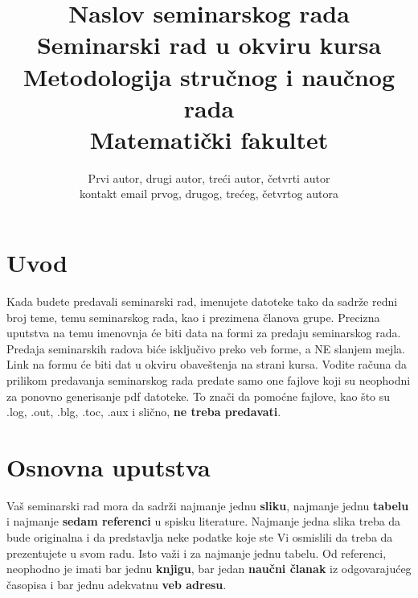 \documentclass[a4paper]{article}
\begin{document}
\title{Naslov seminarskog rada\\ \small{Seminarski rad u okviru kursa\\Metodologija stručnog i naučnog rada\\ Matematički fakultet}}

\author{Prvi autor, drugi autor, treći autor, četvrti autor\\ kontakt email prvog, drugog, trećeg, četvrtog autora}


\maketitle


\tableofcontents

\newpage

\section{Uvod}
\label{sec:uvod}

Kada budete predavali seminarski rad, imenujete datoteke tako da sadrže redni broj teme, temu seminarskog rada, kao i prezimena članova grupe. Precizna uputstva na temu imenovnja će biti data na formi za predaju seminarskog rada. Predaja seminarskih radova biće isključivo preko veb forme, a NE slanjem mejla. Link na formu će biti dat u okviru obaveštenja na strani kursa. Vodite računa da prilikom predavanja seminarskog rada predate samo one fajlove koji su neophodni za ponovno generisanje pdf datoteke. To znači da pomoćne fajlove, kao što su .log, .out, .blg, .toc, .aux i slično, \textbf{ne treba predavati}.

\section{Osnovna uputstva}
Vaš seminarski rad mora da sadrži najmanje jednu \textbf{sliku}, najmanje jednu \textbf{tabelu} i najmanje \textbf{sedam referenci} u spisku literature. Najmanje jedna slika treba da bude originalna i da predstavlja neke podatke koje ste Vi osmislili da treba da prezentujete u svom radu. Isto važi i za najmanje jednu tabelu. 	Od referenci, neophodno je imati bar jednu \textbf{knjigu}, bar jedan \textbf{naučni članak} iz odgovarajućeg časopisa i bar jednu adekvatnu \textbf{veb adresu}. 
\end{document}

